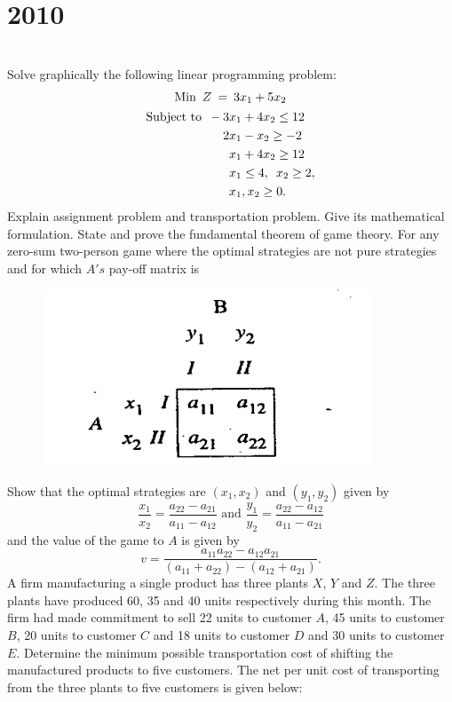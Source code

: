 \section*{2010}
\vspace{-.5cm}
\hrulefill \smallskip\\
 Solve graphically the following linear programming problem:
\begin{gather*}
    \text{Min} \enskip Z \: = \:3x_1 + 5x_2 \\
    \begin{aligned}
        \text{Subject to} \enskip 
        -3&x_1 + 4x_2 \leq 12 \\
        2&x_1 - x_2  \geq -2 \\
        &x_1 + 4x_2 \geq 12 \\
        &x_1 \leq 4,\enskip x_2\geq 2, \\
        &x_1,x_2 \geq 0.
    \end{aligned}
\end{gather*}
\myline
{} Explain assignment problem and transportation problem. Give its mathematical formulation.
\myline
{} State and prove the fundamental theorem of game theory.
\myline
{} For any zero-sum two-person game where the optimal strategies are not pure strategies and for which $A's$ pay-off matrix is 
\begin{figure}[h]
    \centering
    \includegraphics[]{OPT/LPTAGT/3a2010.PNG}
\end{figure} Show that the optimal strategies are $(x_1,x_2)$ and $(y_1,y_2)$ given by \[ \frac{x_1}{x_2} = \frac{a_{22}-a_{21}}{a_{11}-a_{12}} \text{ and } \frac{y_1}{y_2} = \frac{a_{22} - a_{12}}{a_{11} - a_{21}} \] and the value of the game to $A$ is given by \[v = \frac{a_{11}a_{22} - a_{12}a_{21}} {(a_{11}+a_{22}) -(a_{12}+a_{21})}.\]
\myline
{} A firm manufacturing a single product has three plants $X$, $Y$ and $Z$. The three plants have produced 60, 35 and 40 units respectively during this month. The firm had made commitment to sell 22 units to customer $A$, 45 units to customer $B$, 20 units to customer $C$ and 18 units to customer $D$ and 30 units to customer $E$. Determine the minimum possible transportation cost of shifting the manufactured products to five customers. The net per unit cost of transporting from the three plants to five customers is given below:
